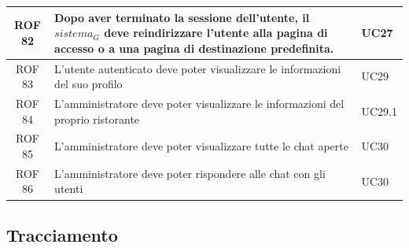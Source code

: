 \documentclass[12pt, oneside]{article}
\begin{document}
\begin{longtable}{|c|p{14cm}|p{2cm}|}
    \hline
    ROF 82 & Dopo aver terminato la sessione dell'utente, il $\textit{sistema}_G$ deve reindirizzare l'utente alla pagina di accesso o a una pagina di destinazione predefinita. & UC27 \\
    \hline
    ROF 83 & L'utente autenticato deve poter visualizzare le informazioni del suo profilo & UC29 \\ 
    \hline
    ROF 84 & L'amministratore deve poter visualizzare le informazioni del proprio ristorante & UC29.1 \\
    \hline
    ROF 85 & L'amministratore deve poter visualizzare tutte le chat aperte & UC30 \\
    \hline
    ROF 86 & L'amministratore deve poter rispondere alle chat con gli utenti & UC30 \\
    \hline
\end{longtable}
\newpage

\setlength{\extrarowheight}{8pt}
\subsection{Tracciamento}
\end{document}
